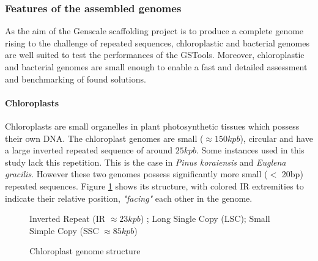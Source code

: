 \documentclass[12pt]{article}
\begin{document}
\subsubsection{Features of the assembled genomes}
\label{sec:genomefeatures}
As the aim of the Genscale scaffolding project is to produce a complete genome rising to the challenge of repeated sequences, chloroplastic and bacterial genomes are well suited to test the performances of the GSTools. Moreover, chloroplastic and bacterial genomes are small enough to enable a fast and detailed assessment and benchmarking of found solutions.

\paragraph*{Chloroplasts}
Chloroplasts are small organelles in plant photosynthetic tissues which possess their own DNA. The chloroplast genomes are small ($\approx 150kpb$), circular and have a large inverted repeated sequence of around $25kpb$. Some instances used in this study lack this repetition. This is the case in \textit{Pinus koraiensis} and \textit{Euglena gracilis}. However these two genomes possess significantly more small ($<$ 20bp) repeated sequences. Figure \ref{fig:chlostructure} shows its structure, with colored IR extremities to indicate their relative position, \textit{"facing"} each other in the genome.
\begin{figure}[h!]
\centering
{}
\caption{Chloroplast genome structure}
{\footnotesize Inverted Repeat (IR $ \approx 23kpb$) ; Long Single Copy (LSC); Small Simple Copy (SSC $\approx 85kpb$)}
\label{fig:chlostructure}
\end{figure}
\end{document}
